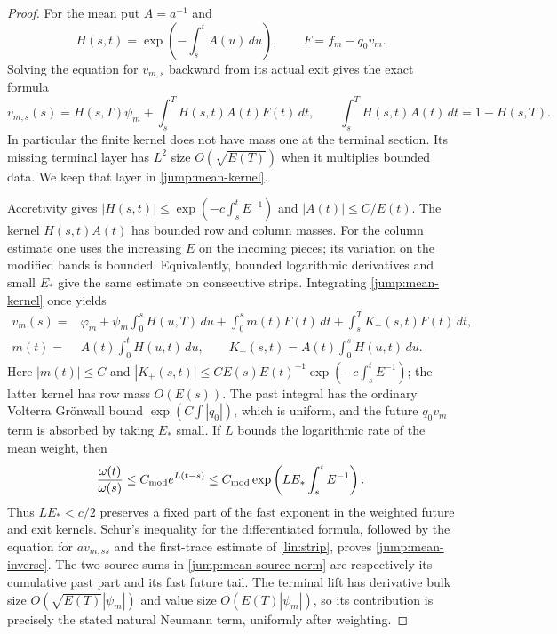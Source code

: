 \begin{proof}
For the mean put $A=a^{-1}$ and
\[
 H(s,t)=\exp\left(-\int_s^t A(u)\,du\right),\qquad
 F=f_m-q_0v_m .
\]
Solving the equation for $v_{m,s}$ backward from its actual exit gives
the exact formula
\begin{equation}\label{jump:mean-kernel}
 v_{m,s}(s)=H(s,T)\psi_m+
       \int_s^T H(s,t)A(t)F(t)\,dt,\qquad
 \int_s^T H(s,t)A(t)\,dt=1-H(s,T).
\end{equation}
In particular the finite kernel does not have mass one at the
terminal section.  Its missing terminal layer has $L^2$ size
$O(\sqrt{E(T)})$ when it multiplies bounded data.  We keep that layer
in \eqref{jump:mean-kernel}.

Accretivity gives
$|H(s,t)|\leq\exp(-c\int_s^t E^{-1})$ and
$|A(t)|\leq C/E(t)$.  The kernel $H(s,t)A(t)$ has bounded row and
column masses.  For the column estimate one uses the increasing $E$
on the incoming pieces; its variation on the modified bands is
bounded.  Equivalently, bounded logarithmic derivatives and small
$E_*$ give the same estimate on consecutive strips.  Integrating
\eqref{jump:mean-kernel} once yields
\[
 \begin{split}
 v_m(s)={}&\varphi_m+\psi_m\int_0^sH(u,T)\,du
       +\int_0^s m(t)F(t)\,dt+\int_s^T K_+(s,t)F(t)\,dt,\\
 m(t)={}&A(t)\int_0^tH(u,t)\,du,\qquad
 K_+(s,t)=A(t)\int_0^sH(u,t)\,du .
 \end{split}
\]
Here $|m(t)|\leq C$ and
$|K_+(s,t)|\leq C E(s)E(t)^{-1}
\exp(-c\int_s^t E^{-1})$; the latter kernel has row mass
$O(E(s))$.  The past integral has the ordinary Volterra
Gr\"onwall bound $\exp(C\int|q_0|)$, which is uniform, and the
future $q_0v_m$ term is absorbed by taking $E_*$ small.
If $L$ bounds the logarithmic rate of the mean weight, then
\[
 \frac{\omega(t)}{\omega(s)}
 \leq C_{\rm mod}e^{L(t-s)}
 \leq C_{\rm mod}\exp\left(LE_*\int_s^t E^{-1}\right).
\]
Thus $LE_*<c/2$ preserves a fixed part of the fast exponent
in the weighted future and exit kernels.
Schur's inequality for the differentiated formula, followed by
the equation for $a v_{m,ss}$ and the first-trace estimate of
\cref{lin:strip}, proves \eqref{jump:mean-inverse}.  The two
source sums in \eqref{jump:mean-source-norm} are respectively its
cumulative past part and its fast future tail.  The terminal lift
has derivative bulk size $O(\sqrt{E(T)}|\psi_m|)$ and value size
$O(E(T)|\psi_m|)$, so its contribution is precisely the stated
natural Neumann term, uniformly after weighting.


\end{proof}

